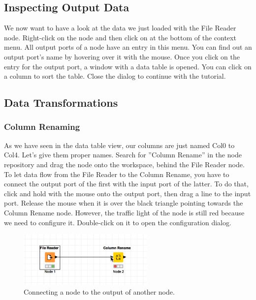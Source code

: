 \subsection{Inspecting Output Data}

We now want to have a look at the data we just loaded with the File Reader node. Right-click on the node and then click on  at the bottom of the context menu. All output ports of a node have an entry in this menu. You can find out an output port's name by hovering over it with the mouse. Once you click on the entry for the output port, a window with a data table is opened. You can click on a column to sort the table. Close the dialog to continue with the tutorial.

\subsection{Data Transformations}

\subsubsection{Column Renaming}
As we have seen in the data table view, our columns are just named Col0 to Col4. Let's give them proper names. Search for ''Column Rename'' in the node repository and drag the node onto the workspace, behind the File Reader node. To let data flow from the File Reader to the Column Rename, you have to connect the output port of the first with the input port of the latter. To do that, click and hold with the mouse onto the output port, then drag a line to the input port. Release the mouse when it is over the black triangle pointing towards the Column Rename node. However, the traffic light of the node is still red because we need to configure it. Double-click on it to open the configuration dialog.

\begin{figure}[h]
\centering
\includegraphics[width=0.59\textwidth]{graphics/knime_basics/connect}
\caption{Connecting a node to the output of another node.}
\label{fig:connect}
\end{figure}

